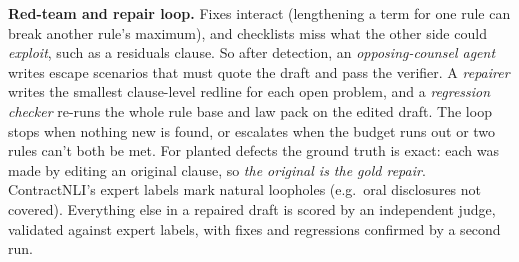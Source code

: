 \documentclass[11pt,a4paper]{article}
\begin{document}
\textbf{Red-team and repair loop.} Fixes interact (lengthening a term for one rule can break another rule's maximum), and checklists miss what the other side could \emph{exploit}, such as a residuals clause. So after detection, an \emph{opposing-counsel agent} writes escape scenarios that must quote the draft and pass the verifier. A \emph{repairer} writes the smallest clause-level redline for each open problem, and a \emph{regression checker} re-runs the whole rule base and law pack on the edited draft. The loop stops when nothing new is found, or escalates when the budget runs out or two rules can't both be met. For planted defects the ground truth is exact: each was made by editing an original clause, so \emph{the original is the gold repair}. ContractNLI's expert labels mark natural loopholes (e.g.\ oral disclosures not covered). Everything else in a repaired draft is scored by an independent judge, validated against expert labels, with fixes and regressions confirmed by a second run.

\end{document}

